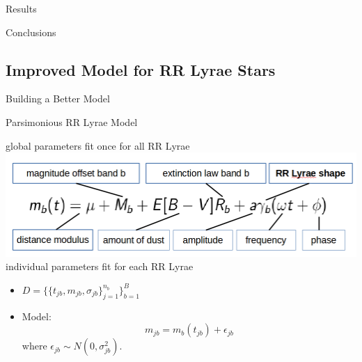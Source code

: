 \documentclass[12pt]{beamer}
\begin{document}
\begin{frame}{Results}



\end{frame}


\begin{frame}{Conclusions}

\end{frame}




\subsection{Improved Model for RR Lyrae Stars}

\begin{frame}{Building a Better Model}

\end{frame}

\begin{frame}{Parsimonious RR Lyrae Model}


\begin{center}
global parameters fit once for all RR Lyrae\\
\includegraphics[scale=.3]{figs/model.png}\\
individual parameters fit for each RR Lyrae
\end{center}

\vspace{.2in}

\begin{itemize}
\item $D=\{\{t_{jb},m_{jb},\sigma_{jb}\}_{j=1}^{n_b}\}_{b=1}^B$
\item Model:
\begin{equation*}
m_{jb} = m_b(t_{jb}) + \epsilon_{jb}
\end{equation*}
where $\epsilon_{jb} \sim N(0,\sigma_{jb}^2)$.
\end{itemize}
\end{frame}
\end{document}
